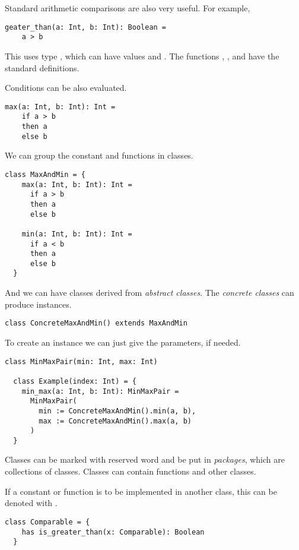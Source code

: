 Standard arithmetic comparisons are also very useful.
For example,
\begin{lstlisting}[label={lst:exampleComparison}]
  geater_than(a: Int, b: Int): Boolean =
    a > b
\end{lstlisting}

This uses type , which can have values \sodafalse and \sodatrue.
The functions \sodaand, \sodaor, and \sodanot have the standard definitions.

Conditions can be also evaluated.
\begin{lstlisting}[label={lst:exampleMax}]
  max(a: Int, b: Int): Int =
    if a > b
    then a
    else b
\end{lstlisting}

We can group the constant and functions in classes.

\begin{lstlisting}[label={lst:exampleClassMax}]
  class MaxAndMin = {
    max(a: Int, b: Int): Int =
      if a > b
      then a
      else b

    min(a: Int, b: Int): Int =
      if a < b
      then a
      else b
  }
\end{lstlisting}

And we can have classes derived from \emph{abstract classes}.
The \emph{concrete classes} can produce instances.

\begin{lstlisting}[label={lst:exampleClassMaxWithIndex}]
  class ConcreteMaxAndMin() extends MaxAndMin
\end{lstlisting}

To create an instance we can just give the parameters, if needed.

\begin{lstlisting}[label={lst:exampleClassMaxAnInstance}]
  class MinMaxPair(min: Int, max: Int)

  class Example(index: Int) = {
    min_max(a: Int, b: Int): MinMaxPair =
      MinMaxPair(
        min := ConcreteMaxAndMin().min(a, b),
        max := ConcreteMaxAndMin().max(a, b)
      )
  }
\end{lstlisting}

Classes can be marked with \sodapackage reserved word and be put in \emph{packages}, which are collections of classes.
Classes can contain functions and other classes.

If a constant or function is to be implemented in another class, this can be denoted with \sodahas.

\begin{lstlisting}[label={lst:exampleAbstractFunction}]
  class Comparable = {
    has is_greater_than(x: Comparable): Boolean
  }
\end{lstlisting}

